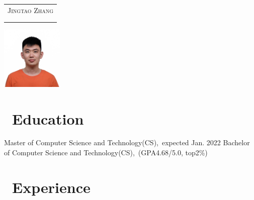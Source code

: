 \documentclass{resume}
\begin{document}

\begin{minipage}{0.7\textwidth}
  \Large{
    \begin{tabu}  { l }
      \scshape{Jingtao Zhang} \\
       \\
       \\
    \end{tabu}
  }
\end{minipage}
\begin{minipage}{0.3\textwidth}
  \raggedleft
  \includegraphics[height=30mm]{avatar}
\end{minipage}

\section{\faGraduationCap\ Education}
Master of Computer Science and Technology(CS),\ expected Jan. 2022
Bachelor of Computer Science and Technology(CS),\ (GPA4.68/5.0, top2\%)

\section{\faUsers\ Experience}
\end{document}
